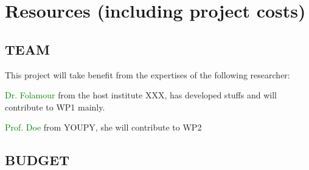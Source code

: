 \lipsum[3]

\section{Resources (including project costs)}

\subsection{TEAM}

This project will take benefit from the expertises of the following researcher:

\textcolor{Green}{Dr. Folamour} from the host institute XXX,  has developed stuffs and   will contribute to WP1 mainly.


\textcolor{Green}{Prof. Doe} from YOUPY, she will contribute to WP2




\lipsum[1]





\subsection{BUDGET}


\lipsum[2]


